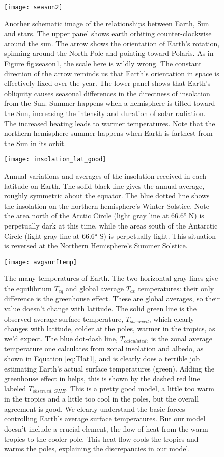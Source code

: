 \documentclass[amstex,12pt]{book}
\begin{document}
\begin{figure}[p]
\centering
\texttt{[image: season2]}%
\caption{Another schematic image of the relationships between Earth, Sun and stars. The upper panel shows earth orbiting counter-clockwise around the sun. The arrow shows the orientation of Earth’s rotation, spinning around the North Pole and pointing toward Polaris. As in Figure {fig:season1}, the scale here is wildly wrong. The constant direction of the arrow reminds us that Earth’s orientation in space is effectively fixed over the year. The lower panel shows that Earth’s obliquity causes seasonal differences in the directness of insolation from the Sun. Summer happens when a hemisphere is tilted toward the Sun, increasing the intensity and duration of solar radiation. The increased heating leads to warmer temperatures. Note that the northern hemisphere summer happens when Earth is farthest from the Sun in its orbit.}   
\label{fig:season2}
\end{figure}

\begin{figure}[p]
\centering
\texttt{[image: insolation\_lat\_good]}%
\caption{Annual variations and averages of the insolation received in each latitude on Earth. The solid black line gives the annual average, roughly symmetric about the equator. The blue dotted line shows the insolation on the northern hemisphere’s Winter Solstice. Note the area north of the Arctic Circle (light gray line at \ang{66.6} N) is perpetually dark at this time, while the areas south of the Antarctic Circle (light gray line at \ang{66.6} S) is perpetually light. This situation is reversed at the Northern Hemisphere’s Summer Solstice.}   
\label{fig:insolat}
\end{figure}

\begin{figure}[p]
\centering
\texttt{[image: avgsurftemp]}%
\caption{The many temperatures of Earth. The two horizontal gray lines give the equilibrium $T_{eq}$ and global average $T_{av}$ temperatures: their only difference is the greenhouse effect. These are global averages, so their value doesn't change with latitude. The solid green line is the observed average surface temperature, $T_{observed}$, which clearly changes with latitude, colder at the poles, warmer in the tropics, as we'd expect. The blue dot-dash line, $T_{calculated}$, is the zonal average temperature one calculates from zonal insolation and albedo, as shown in Equation \ref{eq:Tlat1}, and is clearly does a terrible job estimating Earth's actual surface temperatures (green). Adding the greenhouse effect in helps, this is shown by the dashed red line labeled $T_{observed, GHE}$. This is a pretty good model, a little too warm in the tropics and a little too cool in the poles, but the overall agreement is good. We clearly understand the basic forces controlling Earth's average surface temperatures. But our model doesn't include a crucial element, the flow of heat from the warm tropics to the cooler pole. This heat flow cools the tropics and warms the poles, explaining the discrepancies in our model.}
\label{fig:avgsurftemp}
\end{figure}
\end{document}
